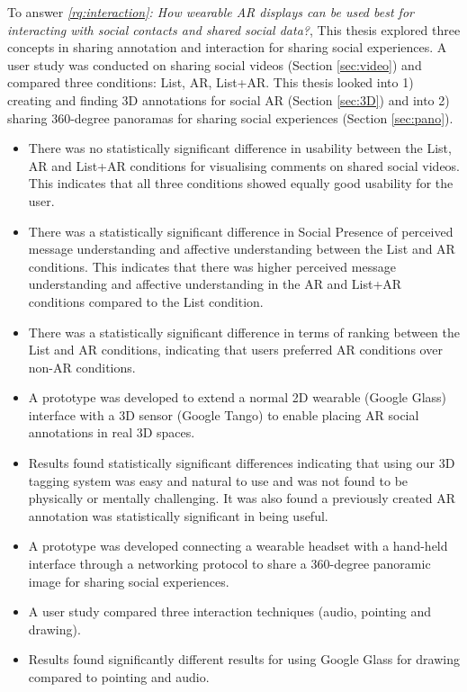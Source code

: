 \noindent
To answer \textit{\ref{rq:interaction}: How wearable AR displays can be used best for interacting with social contacts and shared social data?}, This thesis explored three concepts in sharing annotation and interaction for sharing social experiences. A user study was conducted on sharing social videos (Section \ref{sec:video}) and compared three conditions: List, AR, List+AR. This thesis looked into 1) creating and finding 3D annotations for social AR (Section \ref{sec:3D}) and into 2) sharing 360-degree panoramas for sharing social experiences (Section \ref{sec:pano}). 

\begin{itemize}
    \item{There was no statistically significant difference in usability between the List, AR and List+AR conditions for visualising comments on shared social videos. This indicates that all three conditions showed equally good usability for the user.}
    \item{There was a statistically significant difference in Social Presence of perceived message understanding and affective understanding between the List and AR conditions. This indicates that there was higher perceived message understanding and affective understanding in the AR and List+AR conditions compared to the List condition.}
    \item{There was a statistically significant difference in terms of ranking between the List and AR conditions, indicating that users preferred AR conditions over non-AR conditions.}
    \item{A prototype was developed to extend a normal 2D wearable (Google Glass) interface with a 3D sensor (Google Tango) to enable placing AR social annotations in real 3D spaces.}
    \item{Results found statistically significant differences indicating that using our 3D tagging system was easy and natural to use and was not found to be physically or mentally challenging. It was also found a previously created AR annotation was statistically significant in being useful.}
    \item{A prototype was developed connecting a wearable headset with a hand-held interface through a networking protocol to share a 360-degree panoramic image for sharing social experiences.}
    \item{A user study compared three interaction techniques (audio, pointing and drawing).}
    \item{Results found significantly different results for using Google Glass for drawing compared to pointing and audio.}
\end{itemize}

